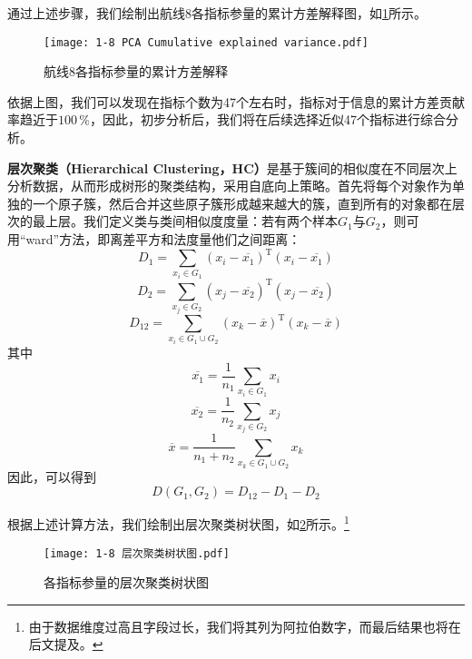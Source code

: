 \documentclass{MathorCupModeling}
\begin{document}
	通过上述步骤，我们绘制出航线8各指标参量的累计方差解释图，如\textcolor{blue}{\cref{fig:附件1-8累计方差解释}}所示。
	\begin{figure}[H]
		\centering
		\texttt{[image: 1-8 PCA Cumulative explained variance.pdf]}
		\caption{航线8各指标参量的累计方差解释}
		\label{fig:附件1-8累计方差解释}
	\end{figure}

	依据上图，我们可以发现在指标个数为47个左右时，指标对于信息的累计方差贡献率趋近于$100\,\%$，因此，初步分析后，我们将在后续选择近似47个指标进行综合分析。

	\textbf{层次聚类（Hierarchical Clustering，HC）}是基于簇间的相似度在不同层次上分析数据，从而形成树形的聚类结构，采用自底向上策略。首先将每个对象作为单独的一个原子簇，然后合并这些原子簇形成越来越大的簇，直到所有的对象都在层次的最上层。\textcolor{blue}{\cite{Paper:层次聚类}}我们定义类与类间相似度度量：若有两个样本$G_1$与$G_2$，则可用“ward”方法，即离差平方和法度量他们之间距离：
	\begin{equation}
		D_1=\sum_{x_i\in G_1}{\left( x_i-\overline{x_1} \right)}^{\text{T}}\left( x_i-\overline{x_1} \right) 
	\end{equation}
	\begin{equation}
		D_2=\sum_{x_j\in G_2}{\left( x_j-\overline{x_2} \right)}^{\text{T}}\left( x_j-\overline{x_2} \right)
	\end{equation}
	\begin{equation}
		D_{12}=\sum_{x_i\in G_1\cup G_2}{\left( x_k-\overline{x} \right)}^{\text{T}}\left( x_k-\overline{x} \right)
	\end{equation}
	其中
	\begin{equation}
		\overline{x_1}=\frac{1}{n_1}\sum_{x_i\in G_1}x_i
	\end{equation}
	\begin{equation}
		\overline{x_2}=\frac{1}{n_2}\sum_{x_j\in G_2}x_j
	\end{equation}
	\begin{equation}
		\overline{x}=\frac{1}{n_1+n_2}\sum_{x_k\in G_1\cup G_2}x_k
	\end{equation}
	因此，可以得到
	\begin{equation}
		D\left(G_1,G_2\right)=D_{12}-D_1-D_2
	\end{equation}

	根据上述计算方法，我们绘制出层次聚类树状图，如\textcolor{blue}{\cref{fig:1-8层次聚类}}所示。\textcolor{blue}{\footnote{由于数据维度过高且字段过长，我们将其列为阿拉伯数字，而最后结果也将在后文提及。}}
	\begin{figure}[H]
		\centering
		\texttt{[image: 1-8 层次聚类树状图.pdf]}
		\caption{各指标参量的层次聚类树状图}
		\label{fig:1-8层次聚类}
	\end{figure}
\end{document}

